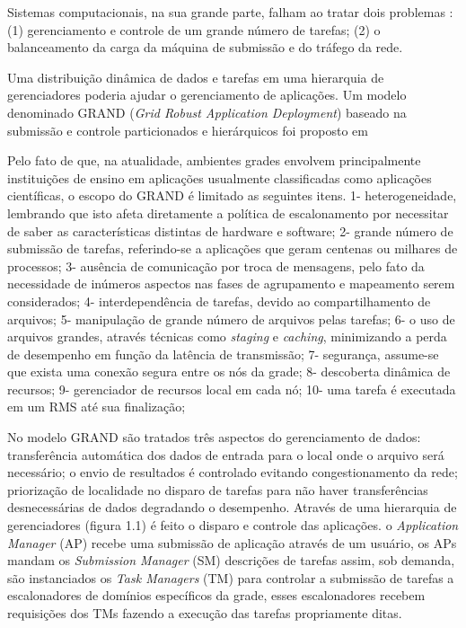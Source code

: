 Sistemas computacionais, na sua grande parte, falham ao tratar dois problemas \cite{Mangan2006}: (1) gerenciamento e controle de um grande número de tarefas; (2) o balanceamento da carga da máquina de submissão e do tráfego da rede.

Uma distribuição dinâmica de dados e tarefas em uma hierarquia de gerenciadores poderia ajudar o gerenciamento de aplicações. Um modelo denominado GRAND (\emph{Grid Robust Application Deployment}) baseado na submissão e controle particionados e hierárquicos foi proposto em \cite{Mangan2006}

Pelo fato de que, na atualidade, ambientes grades envolvem principalmente instituições de ensino em aplicações usualmente classificadas como aplicações científicas, o escopo do GRAND é limitado as seguintes itens. 1- heterogeneidade, lembrando que isto afeta diretamente a política de escalonamento por necessitar de saber as características distintas de hardware e software; 2- grande número de submissão de tarefas, referindo-se a aplicações que geram centenas ou milhares de processos; 3- ausência de comunicação por troca de mensagens, pelo fato da necessidade de inúmeros aspectos nas fases de agrupamento e mapeamento serem considerados; 4- interdependência de tarefas, devido ao compartilhamento de arquivos; 5- manipulação de grande número de arquivos pelas tarefas; 6- o uso de arquivos grandes, através técnicas como \emph{staging} e \emph{caching}, minimizando a perda de desempenho em função da latência de transmissão; 7- segurança, assume-se que exista uma conexão segura entre os nós da grade; 8- descoberta dinâmica de recursos; 9- gerenciador de recursos local em cada nó; 10- uma tarefa é executada em um RMS até sua finalização;

No modelo GRAND são tratados três aspectos do gerenciamento de dados: transferência automática dos dados de entrada para o local onde o arquivo será necessário; o envio de resultados é controlado evitando congestionamento da rede; priorização de localidade no disparo de tarefas para não haver transferências desnecessárias de dados degradando o desempenho. Através de uma hierarquia de gerenciadores (figura 1.1) é feito o disparo e controle das aplicações. o \emph{Application Manager} (AP) recebe uma submissão de aplicação através de um usuário, os APs mandam os \emph{Submission Manager} (SM) descrições de tarefas assim, sob demanda, são instanciados os \emph{Task Managers} (TM) para controlar a submissão de tarefas a escalonadores de domínios específicos da grade, esses escalonadores recebem requisições dos TMs fazendo a execução das tarefas propriamente ditas.

